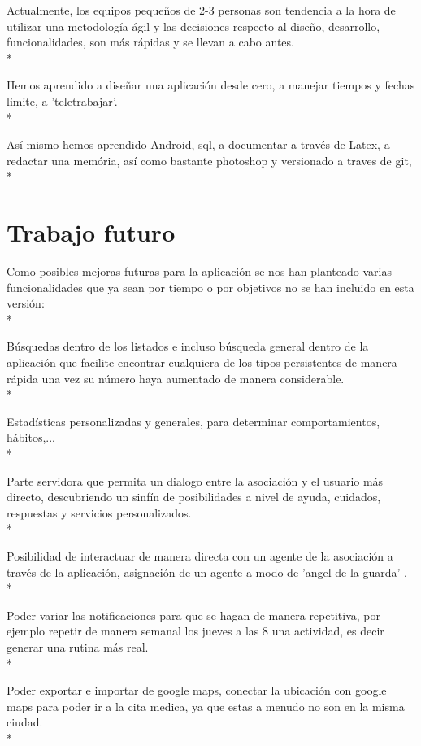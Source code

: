 \documentclass[../pfc.tex]{subfiles}
\begin{document}
	Actualmente, los equipos pequeños de 2-3 personas son tendencia a la hora de utilizar una metodología ágil y las decisiones respecto al diseño, desarrollo, funcionalidades, son más rápidas y se llevan a cabo antes.\\*
	
	Hemos aprendido a diseñar una aplicación desde cero, a manejar tiempos y fechas limite, a 'teletrabajar'.\\*
	
	Así mismo hemos aprendido Android, sql, a documentar a través de Latex, a redactar una memória, así como bastante photoshop y  versionado a traves de git,\\*
		
	
	\section{Trabajo futuro}
	
	Como posibles mejoras futuras para la aplicación se nos han planteado varias funcionalidades que ya sean por tiempo o por objetivos no se han incluido en esta versión:\\*	
	
	Búsquedas dentro de los listados e incluso búsqueda general dentro de la aplicación que facilite encontrar cualquiera de los tipos persistentes de manera rápida una vez su número haya aumentado de manera considerable.\\*
	
	Estadísticas personalizadas y generales, para determinar comportamientos, hábitos,...\\*
	
	Parte servidora que permita un dialogo entre la asociación y el usuario más directo, descubriendo un sinfín de posibilidades a nivel de ayuda, cuidados, respuestas y servicios personalizados.\\*
	
	Posibilidad de interactuar de manera directa con un agente de la asociación a través de la aplicación, asignación de un agente a modo de 'angel de la guarda' .\\*
	
	Poder variar las notificaciones para que se hagan de manera repetitiva, por ejemplo repetir de manera semanal los jueves a las 8 una actividad, es decir generar una rutina más real. \\*
	
	Poder exportar e importar de google maps, conectar la ubicación con google maps para poder ir a la cita medica, ya que estas a menudo no son en la misma ciudad.\\*
	
\end{document}
